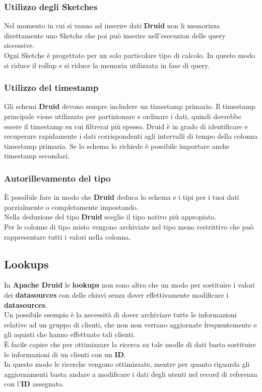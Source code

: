 \documentclass{article}
\begin{document}
\subsubsection{Utilizzo degli Sketches}
Nel momento in cui si vanno ad inserire dati \textbf{Druid} non li memorizza direttamente uno Sketche che poi può inserire nell'esecuzion delle query siccessive. \\Ogni Sketche è progettato per un solo particolare tipo di calcolo. In questo modo si riduce il rollup e si riduce la memoria utilizzata in fase di query.
\subsubsection{Utilizzo del timestamp}
Gli schemi \textbf{Druid} devono sempre includere un timestamp primario. Il timestamp principale viene utilizzato per partizionare e ordinare i dati, quindi dovrebbe essere il timestamp su cui filtrerai più spesso. Druid è in grado di identificare e recuperare rapidamente i dati corrispondenti agli intervalli di tempo della colonna timestamp primaria.
Se lo schema lo richiede è possibile importare anche timestamp secondari.
\subsubsection{Autorillevamento del tipo}
È possibile fare in modo che \textbf{Druid} deduca lo schema e i tipi per i tuoi dati parzialmente o completamente impostando. \\
Nella deduzione del tipo \textbf{Druid} sceglie il tipo nativo più appropiato.\\
Per le colonne di tipo misto vengono archiviate nel tipo meno restrittivo che può rappresentare tutti i valori nella colonna.
\subsection{Lookups}
In \textbf{Apache Druid} le \textbf{lookups} non sono altro che un modo per sostituire i valori dei \textbf{datasources} con delle chiavi senza dover effettivamente modificare i \textbf{datasources}. \\
Un possibile esempio è la necessità di dover archiviare tutte le informazioni relative ad un gruppo di clienti, che non non verrano aggiornate frequentemente e gli aquisti che hanno effettuato tali clienti.\\
È facile capire che per ottimizzare la ricerca su tale modle di dati basta sostituire le informazioni di un clienti con un \textbf{ID}.\\ In questo modo le ricerche vengono ottimizzate, mentre per quanto riguarda gli aggiornamenti basta andare a modificare i dati degli utenti nel record di referenza con l'\textbf{ID} assegnato.
\end{document}
